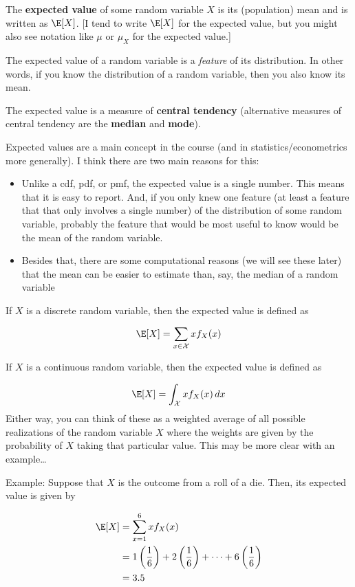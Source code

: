 \documentclass[
  letterpaper,
  DIV=11,
  numbers=noendperiod]{scrreprt}
\begin{document}
The \textbf{expected value} of some random variable \(X\) is its
(population) mean and is written as \(\E[X]\). {[}I tend to write
\(\E[X]\) for the expected value, but you might also see notation like
\(\mu\) or \(\mu_X\) for the expected value.{]}

The expected value of a random variable is a \emph{feature} of its
distribution. In other words, if you know the distribution of a random
variable, then you also know its mean.

The expected value is a measure of \textbf{central tendency}
(alternative measures of central tendency are the \textbf{median} and
\textbf{mode}).

Expected values are a main concept in the course (and in
statistics/econometrics more generally). I think there are two main
reasons for this:

\begin{itemize}
\item
  Unlike a cdf, pdf, or pmf, the expected value is a single number. This
  means that it is easy to report. And, if you only knew one feature (at
  least a feature that that only involves a single number) of the
  distribution of some random variable, probably the feature that would
  be most useful to know would be the mean of the random variable.
\item
  Besides that, there are some computational reasons (we will see these
  later) that the mean can be easier to estimate than, say, the median
  of a random variable
\end{itemize}

If \(X\) is a discrete random variable, then the expected value is
defined as

\[
  \E[X] = \sum_{x \in \mathcal{X}} x f_X(x)
\]

If \(X\) is a continuous random variable, then the expected value is
defined as

\[
  \E[X] = \int_{\mathcal{X}} x f_X(x) \, dx
\] Either way, you can think of these as a weighted average of all
possible realizations of the random variable \(X\) where the weights are
given by the probability of \(X\) taking that particular value. This may
be more clear with an example\ldots{}

{Example: }Suppose that \(X\) is the outcome from a roll of a die. Then,
its expected value is given by

\[
  \begin{aligned}
  \E[X] &= \sum_{x=1}^6 x f_X(x) \\
  &= 1\left(\frac{1}{6}\right) + 2\left(\frac{1}{6}\right) + \cdots + 6\left(\frac{1}{6}\right) \\
  &= 3.5
  \end{aligned}
\]
\end{document}
